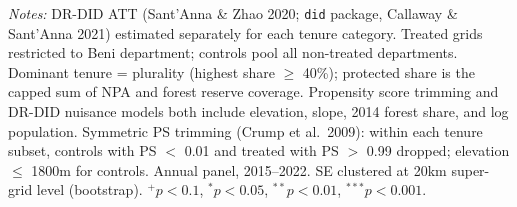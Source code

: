 \begin{table}[htbp]
\begin{tabular}{lcccccc}
\bottomrule
\end{tabular}
\begin{tablenotes}[flushleft]
\small
\item \textit{Notes:} DR-DID ATT (Sant'Anna \& Zhao 2020; \texttt{did} package, Callaway \& Sant'Anna 2021) estimated separately for each tenure category. Treated grids restricted to Beni department; controls pool all non-treated departments. Dominant tenure = plurality (highest share $\geq$ 40\%); protected share is the capped sum of NPA and forest reserve coverage. Propensity score trimming and DR-DID nuisance models both include elevation, slope, 2014 forest share, and log population. Symmetric PS trimming (Crump et al.\ 2009): within each tenure subset, controls with PS $<$ 0.01 and treated with PS $>$ 0.99 dropped; elevation $\leq$ 1800m for controls. Annual panel, 2015--2022. SE clustered at 20km super-grid level (bootstrap). $^{+}p<0.1$, $^{*}p<0.05$, $^{**}p<0.01$, $^{***}p<0.001$.
\end{tablenotes}
\end{table}
